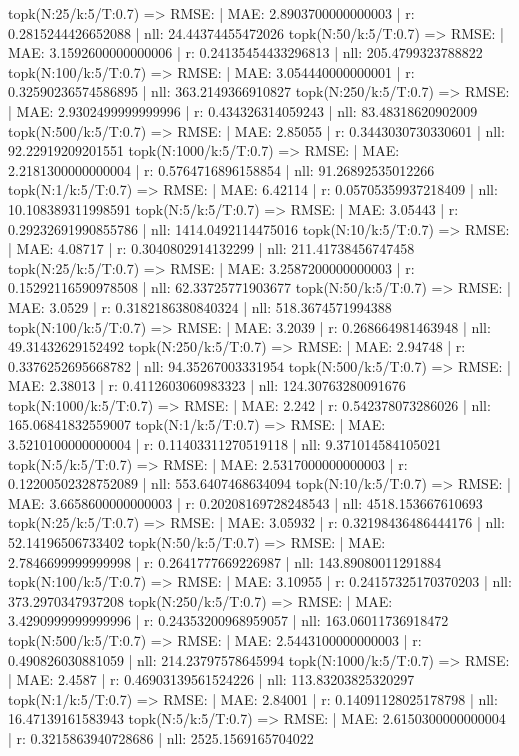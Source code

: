 topk(N:25/k:5/T:0.7) => RMSE: | MAE: 2.8903700000000003 | r: 0.2815244426652088 | nll: 24.44374455472026
topk(N:50/k:5/T:0.7) => RMSE: | MAE: 3.1592600000000006 | r: 0.24135454433296813 | nll: 205.4799323788822
topk(N:100/k:5/T:0.7) => RMSE: | MAE: 3.054440000000001 | r: 0.32590236574586895 | nll: 363.2149366910827
topk(N:250/k:5/T:0.7) => RMSE: | MAE: 2.9302499999999996 | r: 0.434326314059243 | nll: 83.48318620902009
topk(N:500/k:5/T:0.7) => RMSE: | MAE: 2.85055 | r: 0.3443030730330601 | nll: 92.22919209201551
topk(N:1000/k:5/T:0.7) => RMSE: | MAE: 2.2181300000000004 | r: 0.5764716896158854 | nll: 91.26892535012266
topk(N:1/k:5/T:0.7) => RMSE: | MAE: 6.42114 | r: 0.05705359937218409 | nll: 10.108389311998591
topk(N:5/k:5/T:0.7) => RMSE: | MAE: 3.05443 | r: 0.29232691990855786 | nll: 1414.0492114475016
topk(N:10/k:5/T:0.7) => RMSE: | MAE: 4.08717 | r: 0.3040802914132299 | nll: 211.41738456747458
topk(N:25/k:5/T:0.7) => RMSE: | MAE: 3.2587200000000003 | r: 0.15292116590978508 | nll: 62.33725771903677
topk(N:50/k:5/T:0.7) => RMSE: | MAE: 3.0529 | r: 0.3182186380840324 | nll: 518.3674571994388
topk(N:100/k:5/T:0.7) => RMSE: | MAE: 3.2039 | r: 0.268664981463948 | nll: 49.31432629152492
topk(N:250/k:5/T:0.7) => RMSE: | MAE: 2.94748 | r: 0.3376252695668782 | nll: 94.35267003331954
topk(N:500/k:5/T:0.7) => RMSE: | MAE: 2.38013 | r: 0.4112603060983323 | nll: 124.30763280091676
topk(N:1000/k:5/T:0.7) => RMSE: | MAE: 2.242 | r: 0.542378073286026 | nll: 165.06841832559007
topk(N:1/k:5/T:0.7) => RMSE: | MAE: 3.5210100000000004 | r: 0.11403311270519118 | nll: 9.371014584105021
topk(N:5/k:5/T:0.7) => RMSE: | MAE: 2.5317000000000003 | r: 0.12200502328752089 | nll: 553.6407468634094
topk(N:10/k:5/T:0.7) => RMSE: | MAE: 3.6658600000000003 | r: 0.20208169728248543 | nll: 4518.153667610693
topk(N:25/k:5/T:0.7) => RMSE: | MAE: 3.05932 | r: 0.32198436486444176 | nll: 52.14196506733402
topk(N:50/k:5/T:0.7) => RMSE: | MAE: 2.7846699999999998 | r: 0.2641777669226987 | nll: 143.89080011291884
topk(N:100/k:5/T:0.7) => RMSE: | MAE: 3.10955 | r: 0.24157325170370203 | nll: 373.2970347937208
topk(N:250/k:5/T:0.7) => RMSE: | MAE: 3.4290999999999996 | r: 0.24353200968959057 | nll: 163.06011736918472
topk(N:500/k:5/T:0.7) => RMSE: | MAE: 2.5443100000000003 | r: 0.490826030881059 | nll: 214.23797578645994
topk(N:1000/k:5/T:0.7) => RMSE: | MAE: 2.4587 | r: 0.46903139561524226 | nll: 113.83203825320297
topk(N:1/k:5/T:0.7) => RMSE: | MAE: 2.84001 | r: 0.14091128025178798 | nll: 16.47139161583943
topk(N:5/k:5/T:0.7) => RMSE: | MAE: 2.6150300000000004 | r: 0.3215863940728686 | nll: 2525.1569165704022
